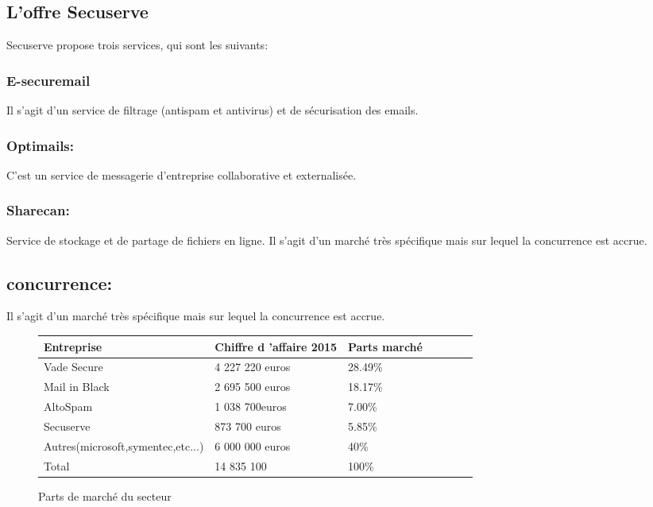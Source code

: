 \subsection{L’offre Secuserve}
Secuserve propose trois services, qui sont les suivants:
\subsubsection{E-securemail}
Il s’agit d’un service de filtrage (antispam et antivirus) et de sécurisation des emails.
\subsubsection{Optimails:} C’est un service de messagerie d’entreprise collaborative et externalisée.
\subsubsection{Sharecan:}Service de stockage et de partage de fichiers en ligne.
Il s’agit d’un marché très spécifique mais sur lequel la concurrence est accrue.

\subsection{concurrence:}
Il s’agit d’un marché très spécifique mais sur lequel la concurrence est accrue.\\

\begin{figure}[!h]
\begin{center}
\begin{tabular}{|l|l|l|l|c|l|l|}
  \hline
 Entreprise & Chiffre d 'affaire 2015& Parts marché\\
  \hline
   Vade Secure& 4 227 220 euros & 28.49\% \\
   \hline
  Mail in Black& 2 695 500 euros & 18.17\% \\
  \hline
  AltoSpam& 1 038 700euros & 7.00\% \\
  \hline  
   \rowcolor{orange}Secuserve& 873 700 euros& 5.85\% \\
	\hline
   Autres(microsoft,symentec,etc...)& 6 000 000 euros & 40\%\\
	\hline  
    Total& 14 835 100 & 100\% \\
  \hline
\end{tabular}
\end{center}
\caption{Parts de marché du secteur}
\end{figure}

